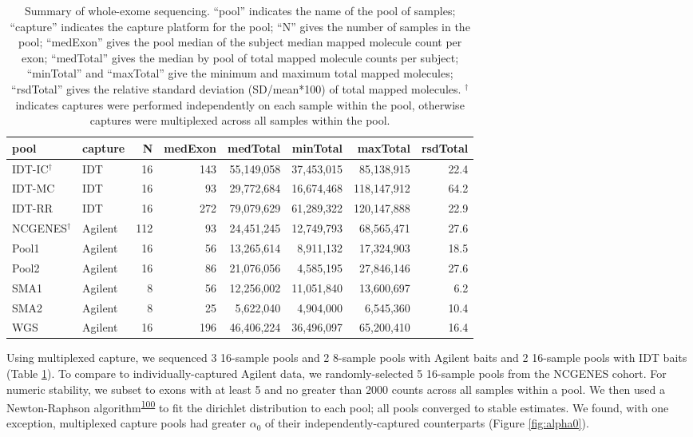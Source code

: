 \documentclass[11pt,letterpaper]{book}
\begin{document}
\begin{table}

\caption[Summary of whole-exome sequencing for CNV project.]{\label{tab:poolSummary}Summary of whole-exome sequencing. ``pool'' indicates the name of the pool of samples; ``capture'' indicates the capture platform for the pool; ``N'' gives the number of samples in the pool; ``medExon'' gives the pool median of the subject median mapped molecule count per exon; ``medTotal'' gives the median by pool of total mapped molecule counts per subject; ``minTotal'' and ``maxTotal'' give the minimum and maximum total mapped molecules; ``rsdTotal'' gives the relative standard deviation (SD/mean*100) of total mapped molecules. \(^\dagger\) indicates captures were performed independently on each sample within the pool, otherwise captures were multiplexed across all samples within the pool.}
\centering
\begin{tabular}[t]{llrrrrrr}
\toprule
pool & capture & N & medExon & medTotal & minTotal & maxTotal & rsdTotal\\
\midrule
IDT-IC$^\dagger$ & IDT & 16 & 143 & 55,149,058 & 37,453,015 & 85,138,915 & 22.4\\
IDT-MC & IDT & 16 & 93 & 29,772,684 & 16,674,468 & 118,147,912 & 64.2\\
IDT-RR & IDT & 16 & 272 & 79,079,629 & 61,289,322 & 120,147,888 & 22.9\\
NCGENES$^\dagger$ & Agilent & 112 & 93 & 24,451,245 & 12,749,793 & 68,565,471 & 27.6\\
Pool1 & Agilent & 16 & 56 & 13,265,614 & 8,911,132 & 17,324,903 & 18.5\\
\addlinespace
Pool2 & Agilent & 16 & 86 & 21,076,056 & 4,585,195 & 27,846,146 & 27.6\\
SMA1 & Agilent & 8 & 56 & 12,256,002 & 11,051,840 & 13,600,697 & 6.2\\
SMA2 & Agilent & 8 & 25 & 5,622,040 & 4,904,000 & 6,545,360 & 10.4\\
WGS & Agilent & 16 & 196 & 46,406,224 & 36,496,097 & 65,200,410 & 16.4\\
\bottomrule
\end{tabular}
\end{table}

Using multiplexed capture, we sequenced 3 16-sample pools and 2 8-sample pools with Agilent baits and 2 16-sample pools with IDT baits (Table \ref{tab:poolSummary}).
To compare to individually-captured Agilent data, we randomly-selected 5 16-sample pools from the NCGENES cohort.
For numeric stability, we subset to exons with at least 5 and no greater than 2000 counts across all samples within a pool.
We then used a Newton-Raphson algorithm\textsuperscript{\protect\hyperlink{ref-minka:2000aa}{100}} to fit the dirichlet distribution to each pool; all pools converged to stable estimates.
We found, with one exception, multiplexed capture pools had greater \(\alpha_0\) of their independently-captured counterparts (Figure \ref{fig:alpha0}).
\end{document}
